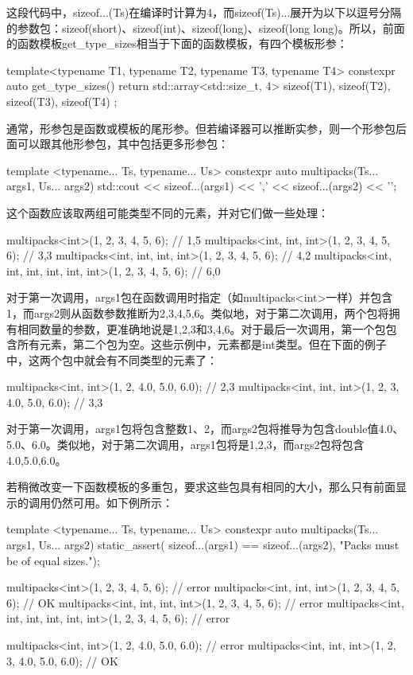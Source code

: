 这段代码中，sizeof...(Ts)在编译时计算为4，而sizeof(Ts)...展开为以下以逗号分隔的参数包：sizeof(short)、sizeof(int)、sizeof(long)、sizeof(long long)。所以，前面的函数模板get_type_sizes相当于下面的函数模板，有四个模板形参：

\begin{cppcode}
template<typename T1, typename T2,
         typename T3, typename T4>
constexpr auto get_type_sizes()
{
	return std::array<std::size_t, 4> {
		sizeof(T1), sizeof(T2), sizeof(T3), sizeof(T4)
	};
}
\end{cppcode}

通常，形参包是函数或模板的尾形参。但若编译器可以推断实参，则一个形参包后面可以跟其他形参包，其中包括更多形参包：

\begin{cppcode}
template <typename... Ts, typename... Us>
constexpr auto multipacks(Ts... args1, Us... args2)
{
	std::cout << sizeof...(args1) << ','
	          << sizeof...(args2) << '\n';
}
\end{cppcode}

这个函数应该取两组可能类型不同的元素，并对它们做一些处理：

\begin{cppcode}
multipacks<int>(1, 2, 3, 4, 5, 6);
                // 1,5
multipacks<int, int, int>(1, 2, 3, 4, 5, 6);
                // 3,3
multipacks<int, int, int, int>(1, 2, 3, 4, 5, 6);
                // 4,2
multipacks<int, int, int, int, int, int>(1, 2, 3, 4, 5, 6);
                // 6,0
\end{cppcode}

对于第一次调用，args1包在函数调用时指定（如multipacks<int>一样）并包含1，而args2则从函数参数推断为2,3,4,5,6。类似地，对于第二次调用，两个包将拥有相同数量的参数，更准确地说是1,2,3和3,4,6。对于最后一次调用，第一个包包含所有元素，第二个包为空。这些示例中，元素都是int类型。但在下面的例子中，这两个包中就会有不同类型的元素了：

\begin{cppcode}
multipacks<int, int>(1, 2, 4.0, 5.0, 6.0); // 2,3
multipacks<int, int, int>(1, 2, 3, 4.0, 5.0, 6.0); // 3,3
\end{cppcode}

对于第一次调用，args1包将包含整数1、2，而args2包将推导为包含double值4.0、5.0、6.0。类似地，对于第二次调用，args1包将是1,2,3，而args2包将包含4.0,5.0,6.0。

若稍微改变一下函数模板的多重包，要求这些包具有相同的大小，那么只有前面显示的调用仍然可用。如下例所示：

\begin{cppcode}
template <typename... Ts, typename... Us>
constexpr auto multipacks(Ts... args1, Us... args2)
{
	static_assert(
	sizeof...(args1) == sizeof...(args2),
	"Packs must be of equal sizes.");
}

multipacks<int>(1, 2, 3, 4, 5, 6); // error
multipacks<int, int, int>(1, 2, 3, 4, 5, 6); // OK
multipacks<int, int, int, int>(1, 2, 3, 4, 5, 6); // error
multipacks<int, int, int, int, int, int>(1, 2, 3, 4, 5, 6); // error

multipacks<int, int>(1, 2, 4.0, 5.0, 6.0); // error
multipacks<int, int, int>(1, 2, 3, 4.0, 5.0, 6.0); // OK
\end{cppcode}

